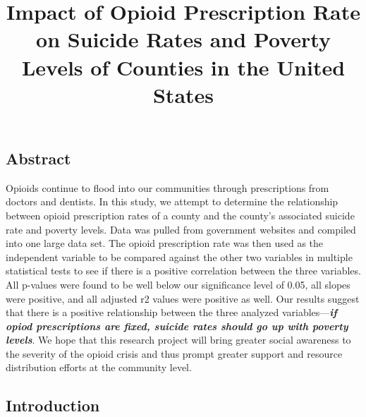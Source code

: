 \documentclass[
]{article}
\title{Impact of Opioid Prescription Rate on Suicide Rates and Poverty Levels
of Counties in the United States}
\author{}
\date{\vspace{-2.5em}}
\begin{document}
\maketitle

\hypertarget{abstract}{%
\subsection{Abstract}\label{abstract}}

Opioids continue to flood into our communities through prescriptions
from doctors and dentists. In this study, we attempt to determine the
relationship between opioid prescription rates of a county and the
county's associated suicide rate and poverty levels. Data was pulled
from government websites and compiled into one large data set. The
opioid prescription rate was then used as the independent variable to be
compared against the other two variables in multiple statistical tests
to see if there is a positive correlation between the three variables.
All p-values were found to be well below our significance level of 0.05,
all slopes were positive, and all adjusted r2 values were positive as
well. Our results suggest that there is a positive relationship between
the three analyzed variables---\textbf{\emph{if opiod prescriptions are
fixed, suicide rates should go up with poverty levels}}. We hope that
this research project will bring greater social awareness to the
severity of the opioid crisis and thus prompt greater support and
resource distribution efforts at the community level.

\newpage

\hypertarget{introduction}{%
\subsection{Introduction}\label{introduction}}
\end{document}
